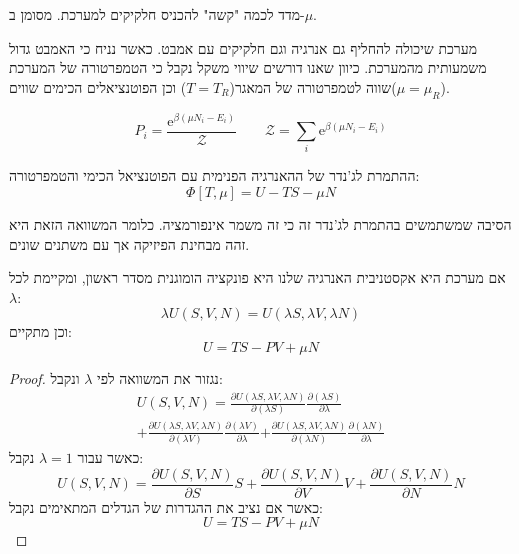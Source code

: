 \documentclass{tstextbook}
\begin{document}
\begin{reminder}
מדד לכמה "קשה" להכניס חלקיקים למערכת. מסומן ב-\(\mu\).

\end{reminder}
\begin{definition}
מערכת שיכולה להחליף גם אנרגיה וגם חלקיקים עם אמבט. כאשר נניח כי האמבט גדול משמעותית מהמערכת. כיוון שאנו דורשים שיווי משקל נקבל כי הטמפרטורה של המערכת שווה לטמפרטורה של המאגר(\(T=T_{R}\)) וכן הפוטנציאלים הכימים שווים(\(\mu=\mu_{R}\)).

\end{definition}
\begin{proposition}
$$P_{i}=\frac{\mathrm{e}^{\beta\left(\mu N_{i}-E_{i}\right)}}{\mathcal{Z}}\qquad {\mathcal Z}=\sum_{i}\mathrm{e}^{\beta\left( \mu N_{i}-E_{i} \right)}$$

\end{proposition}
\begin{definition}
ההתמרת לג'נדר של ההאנרגיה הפנימית עם הפוטנציאל הכימי והטמפרטורה:
$$\Phi[T,\mu]=U-T S-\mu N$$

\end{definition}
\begin{remark}
הסיבה שמשתמשים בהתמרת לג'נדר זה כי זה משמר אינפורמציה. כלומר המשוואה הזאת היא זהה מבחינת הפיזיקה אך עם משתנים שונים.

\end{remark}
\begin{proposition}
אם מערכת היא אקסטניבית האנרגיה שלנו היא פונקציה הומוגנית מסדר ראשון, ומקיימת לכל \(\lambda\):
$$\lambda U(S,V,N)=U(\lambda S,\lambda V,\lambda N)$$
וכן מתקיים:
$$U=T S-P V+\mu N$$

\end{proposition}
\begin{proof}
נגזור את המשוואה לפי \(\lambda\) ונקבל:
\begin{gather*}{{U(S,V,N)=\frac{\partial U\left( \lambda S,\lambda V,\lambda N \right)}{\partial\left( \lambda S \right)}\frac{\partial\left( \lambda S \right)}{\partial\lambda}}} \\{{+\frac{\partial U\left( \lambda S,\lambda V,\lambda N \right)}{\partial\left( \lambda V \right)}\frac{\partial\left( \lambda V \right)}{\partial\lambda}}}{{+\frac{\partial U\left( \lambda S,\lambda V,\lambda N \right)}{\partial\left( \lambda N \right)}\frac{\partial\left( \lambda N \right)}{\partial\lambda}}} 
\end{gather*}
כאשר עבור \(\lambda=1\) נקבל:
$$U(S,V,N)=\frac{\partial U(S,V,N)}{\partial S}S+\frac{\partial U(S,V,N)}{\partial V}V+\frac{\partial U(S,V,N)}{\partial N}N$$
כאשר אם נציב את ההגדרות של הגדלים המתאימים נקבל:
$$U=T S-P V+\mu N$$

\end{proof}
\end{document}
